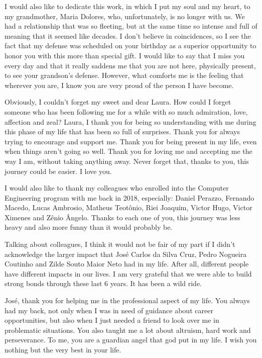 \begin{spacing}{1.0}
I would also like to dedicate this work, in which I put my soul and my heart, to my grandmother, Maria Dolores, who, unfortunately, is no longer with us. We had a relationship that was so fleeting, but at the same time so intense and full of meaning that it seemed like decades. I don't believe in coincidences, so I see the fact that my defense was scheduled on your birthday as a superior opportunity to honor you with this more than special gift. I would like to say that I miss you every day and that it really saddens me that you are not here, physically present, to see your grandson's defense. However, what comforts me is the feeling that wherever you are, I know you are very proud of the person I have become.

Obviously, I couldn't forget my sweet and dear Laura. How could I forget someone who has been following me for a while with so much admiration, love, affection and zeal? Laura, I thank you for being so understanding with me during this phase of my life that has been so full of surprises. Thank you for always trying to encourage and support me. Thank you for being present in my life, even when things aren't going so well. Thank you for loving me and accepting me the way I am, without taking anything away. Never forget that, thanks to you, this journey could be easier. I love you.

I would also like to thank my colleagues who enrolled into the Computer Engineering program with me back in 2018, especially: Daniel Perazzo, Fernando Macedo, Lucas Ambrosio, Matheus Teotônio, Riei Joaquim, Victor Hugo, Victor Ximenes and Zênio Ângelo. Thanks to each one of you, this journey was less heavy and also more funny than it would probably be.

Talking about colleagues, I think it would not be fair of my part if I didn't acknowledge the larger impact that José Carlos da Silva Cruz, Pedro Nogueira Coutinho and Zilde Souto Maior Neto had in my life. After all, different people have different impacts in our lives. I am very grateful that we were able to build strong bonds through these last 6 years. It has been a wild ride.

José, thank you for helping me in the professional aspect of my life. You always had my back, not only when I was in need of guidance about career opportunities, but also when I just needed a friend to look over me in problematic situations. You also taught me a lot about altruism, hard work and perseverance. To me, you are a guardian angel that god put in my life. I wish you nothing but the very best in your life.


\end{spacing}
